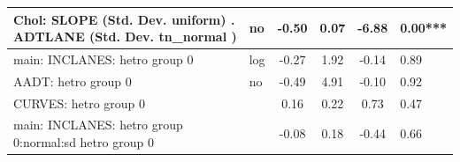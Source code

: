\begin{table}
\begin{center}
\begin{tabular}{|l|l|c|c|c|l|}
			\hline
			 Chol: SLOPE (Std. Dev. uniform) . ADTLANE (Std. Dev.   tn_normal ) & no & -0.50 & 0.07 & -6.88 & 0.00*** \\
			\hline
			main: INCLANES: hetro group 0 & log & -0.27 & 1.92 & -0.14 & 0.89 \\
			\hline
			AADT: hetro group 0 & no & -0.49 & 4.91 & -0.10 & 0.92 \\
			\hline
			CURVES: hetro group 0 &  & 0.16 & 0.22 & 0.73 & 0.47 \\
			\hline
			main: INCLANES: hetro group 0:normal:sd  hetro group 0 &  & -0.08 & 0.18 & -0.44 & 0.66 \\
			\hline
		\end{tabular}
	\end{center}
\end{table}